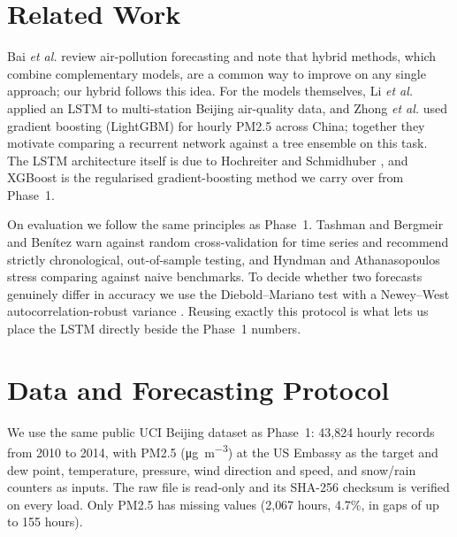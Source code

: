 \documentclass[onecolumn,11pt,journal]{IEEEtran}
\newcommand{\ugm}{\si{\micro\gram\per\cubic\metre}}
\begin{document}
\section{Related Work}
Bai \emph{et al.} \cite{bai2018} review air-pollution forecasting and note that hybrid methods, which combine complementary models, are a common way to improve on any single approach; our hybrid follows this idea. For the models themselves, Li \emph{et al.} \cite{li2017lstm} applied an LSTM to multi-station Beijing air-quality data, and Zhong \emph{et al.} \cite{zhong2021lightgbm} used gradient boosting (LightGBM) for hourly PM2.5 across China; together they motivate comparing a recurrent network against a tree ensemble on this task. The LSTM architecture itself is due to Hochreiter and Schmidhuber \cite{hochreiter1997}, and XGBoost \cite{chen2016xgboost} is the regularised gradient-boosting method we carry over from Phase~1.

On evaluation we follow the same principles as Phase~1. Tashman \cite{tashman2000} and Bergmeir and Ben\'itez \cite{bergmeir2012} warn against random cross-validation for time series and recommend strictly chronological, out-of-sample testing, and Hyndman and Athanasopoulos \cite{hyndman2021fpp3} stress comparing against naive benchmarks. To decide whether two forecasts genuinely differ in accuracy we use the Diebold--Mariano test \cite{diebold1995} with a Newey--West autocorrelation-robust variance \cite{newey1987}. Reusing exactly this protocol is what lets us place the LSTM directly beside the Phase~1 numbers.

\section{Data and Forecasting Protocol}
We use the same public UCI Beijing dataset \cite{uci_beijing,liang2015} as Phase~1: 43{,}824 hourly records from 2010 to 2014, with PM2.5 (\ugm{}) at the US Embassy as the target and dew point, temperature, pressure, wind direction and speed, and snow/rain counters as inputs. The raw file is read-only and its SHA-256 checksum is verified on every load. Only PM2.5 has missing values (2{,}067 hours, 4.7\%, in gaps of up to 155 hours).
\end{document}
